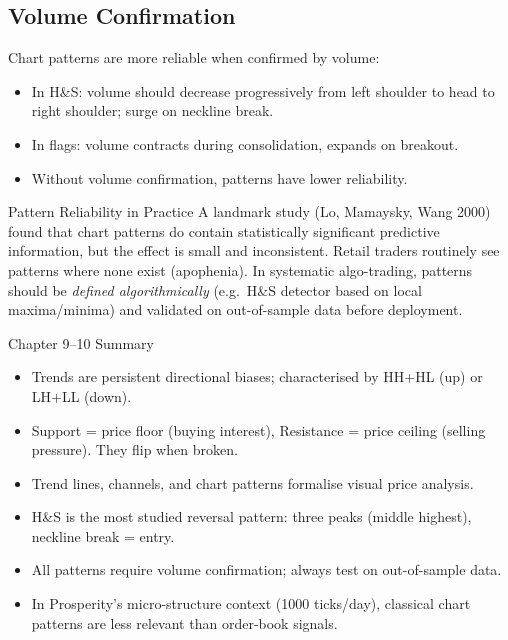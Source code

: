 \documentclass[12pt,a4paper,openany]{report}
\theoremstyle{definition}
\begin{document}
\subsection{Volume Confirmation}

Chart patterns are more reliable when confirmed by volume:
\begin{itemize}
  \item In H\&S: volume should decrease progressively from left shoulder to head to right shoulder; surge on neckline break.
  \item In flags: volume contracts during consolidation, expands on breakout.
  \item Without volume confirmation, patterns have lower reliability.
\end{itemize}

\begin{warningbox}{Pattern Reliability in Practice}
A landmark study (Lo, Mamaysky, Wang 2000) found that chart patterns do contain statistically significant predictive information, but the effect is small and inconsistent. Retail traders routinely see patterns where none exist (apophenia). In systematic algo-trading, patterns should be \emph{defined algorithmically} (e.g.\ H\&S detector based on local maxima/minima) and validated on out-of-sample data before deployment.
\end{warningbox}

\begin{takeawaybox}{Chapter 9--10 Summary}
\begin{itemize}
  \item Trends are persistent directional biases; characterised by HH+HL (up) or LH+LL (down).
  \item Support = price floor (buying interest), Resistance = price ceiling (selling pressure). They flip when broken.
  \item Trend lines, channels, and chart patterns formalise visual price analysis.
  \item H\&S is the most studied reversal pattern: three peaks (middle highest), neckline break = entry.
  \item All patterns require volume confirmation; always test on out-of-sample data.
  \item In Prosperity's micro-structure context (1000 ticks/day), classical chart patterns are less relevant than order-book signals.
\end{itemize}
\end{takeawaybox}
\end{document}
